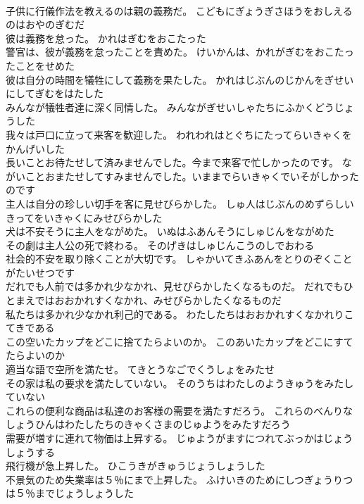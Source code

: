 \documentclass[8pt]{extreport}
\begin{document}
\begin{CJK}{UTF8}{min}
\\	子供に行儀作法を教えるのは親の義務だ。	こどもにぎょうぎさほうをおしえるのはおやのぎむだ 
\\	彼は義務を怠った。	かれはぎむをおこたった 
\\	警官は、彼が義務を怠ったことを責めた。	けいかんは、かれがぎむをおこたったことをせめた 
\\	彼は自分の時間を犠牲にして義務を果たした。	かれはじぶんのじかんをぎせいにしてぎむをはたした 
\\	みんなが犠牲者達に深く同情した。	みんながぎせいしゃたちにふかくどうじょうした 
\\	我々は戸口に立って来客を歓迎した。	われわれはとぐちにたってらいきゃくをかんげいした 
\\	長いことお待たせして済みませんでした。今まで来客で忙しかったのです。	ながいことおまたせしてすみませんでした。いままでらいきゃくでいそがしかったのです 
\\	主人は自分の珍しい切手を客に見せびらかした。	しゅ人はじぶんのめずらしいきってをいきゃくにみせびらかした 
\\	犬は不安そうに主人をながめた。	いぬはふあんそうにしゅじんをながめた 
\\	その劇は主人公の死で終わる。	そのげきはしゅじんこうのしでおわる 
\\	社会的不安を取り除くことが大切です。	しゃかいてきふあんをとりのぞくことがたいせつです 
\\	だれでも人前では多かれ少なかれ、見せびらかしたくなるものだ。	だれでもひとまえではおおかれすくなかれ、みせびらかしたくなるものだ 
\\	私たちは多かれ少なかれ利己的である。	わたしたちはおおかれすくなかれりこてきである 
\\	この空いたカップをどこに捨てたらよいのか。	このあいたカップをどこにすてたらよいのか 
\\	適当な語で空所を満たせ。	てきとうなごでくうしょをみたせ 
\\	その家は私の要求を満たしていない。	そのうちはわたしのようきゅうをみたしていない 
\\	これらの便利な商品は私達のお客様の需要を満たすだろう。	これらのべんりなしょうひんはわたしたちのきゃくさまのじゅようをみたすだろう 
\\	需要が増すに連れて物価は上昇する。	じゅようがますにつれてぶっかはじょうしょうする 
\\	飛行機が急上昇した。	ひこうきがきゅうじょうしょうした 
\\	不景気のため失業率は５％にまで上昇した。	ふけいきのためにしつぎょうりつは５％までじょうしょうした 

\end{CJK}
\end{document}
